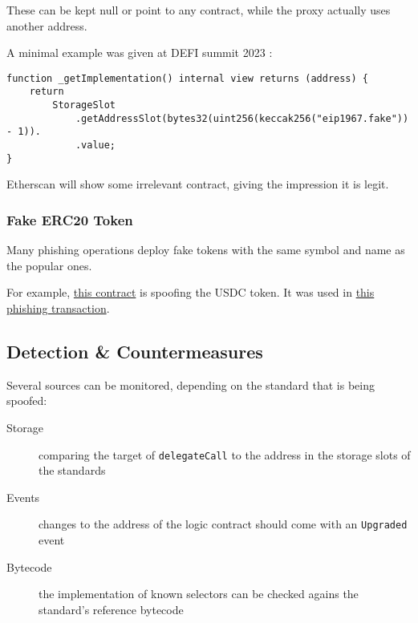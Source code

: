 These can be kept null or point to any contract, while the proxy actually uses another address.

A minimal example was given at DEFI summit 2023 \cite{video-masquerading-code}:

\begin{lstlisting}[language=Solidity]
function _getImplementation() internal view returns (address) {
    return
        StorageSlot
            .getAddressSlot(bytes32(uint256(keccak256("eip1967.fake")) - 1)).
            .value;
}
\end{lstlisting}

Etherscan will show some irrelevant contract, giving the impression it is legit.

\pagebreak
\subsubsection{Fake ERC20 Token}

Many phishing operations deploy fake tokens with the same symbol and name as the popular ones.

For example, \href{https://etherscan.io/address/0x5ed7ca349efc40550eecef4b288158fb2b9f12de#code}{this contract} is spoofing the USDC token.
It was used in \href{https://explorer.phalcon.xyz/tx/eth/0x7448178a8a03a0f1f298b697507f0e9172eacf1d32d422f48d0345c19c76eba3?line=33}{this phishing transaction}.

\subsection{Detection \& Countermeasures}

Several sources can be monitored, depending on the standard that is being spoofed:

\begin{description}
\item[Storage]{comparing the target of \lstinline[language=Solidity]{delegateCall} to the address in the storage slots of the standards}
\item[Events]{changes to the address of the logic contract should come with an \lstinline[language=Solidity]{Upgraded} event}
\item[Bytecode]{the implementation of known selectors can be checked agains the standard's reference bytecode}
\end{description}
